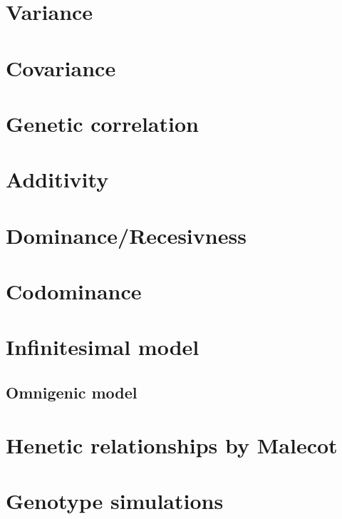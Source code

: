 \documentclass[
]{book}
\begin{document}
\hypertarget{variance}{%
\section{Variance}\label{variance}}

\hypertarget{covariance}{%
\section{Covariance}\label{covariance}}

\hypertarget{genetic-correlation}{%
\section{Genetic correlation}\label{genetic-correlation}}

\hypertarget{additivity}{%
\section{Additivity}\label{additivity}}

\hypertarget{dominancerecesivness}{%
\section{Dominance/Recesivness}\label{dominancerecesivness}}

\hypertarget{codominance}{%
\section{Codominance}\label{codominance}}

\hypertarget{infinitesimal-model}{%
\section{Infinitesimal model}\label{infinitesimal-model}}

\hypertarget{omnigenic-model}{%
\subsection{Omnigenic model}\label{omnigenic-model}}

\hypertarget{henetic-relationships-by-malecot}{%
\section{Henetic relationships by Malecot}\label{henetic-relationships-by-malecot}}

\hypertarget{genotype-simulations}{%
\section{Genotype simulations}\label{genotype-simulations}}
\end{document}
